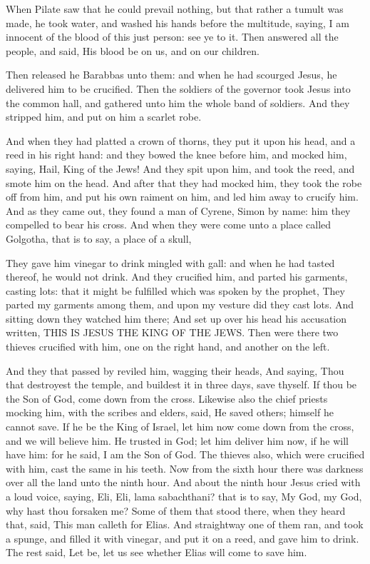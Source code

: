  When Pilate saw that he could prevail nothing, but that
rather a tumult was made, he took water, and washed his hands before the
multitude, saying, I am innocent of the blood of this just person: see
ye to it.  Then answered all the people, and said, His
blood be on us, and on our children.

 Then released he Barabbas unto them: and when he had
scourged Jesus, he delivered him to be crucified.  Then
the soldiers of the governor took Jesus into the common hall, and
gathered unto him the whole band of soldiers.  And they
stripped him, and put on him a scarlet robe.

 And when they had platted a crown of thorns, they put it
upon his head, and a reed in his right hand: and they bowed the knee
before him, and mocked him, saying, Hail, King of the Jews!
 And they spit upon him, and took the reed, and smote him
on the head.  And after that they had mocked him, they
took the robe off from him, and put his own raiment on him, and led him
away to crucify him.  And as they came out, they found a
man of Cyrene, Simon by name: him they compelled to bear his cross.
 And when they were come unto a place called Golgotha,
that is to say, a place of a skull,

 They gave him vinegar to drink mingled with gall: and
when he had tasted thereof, he would not drink.  And they
crucified him, and parted his garments, casting lots: that it might be
fulfilled which was spoken by the prophet, They parted my garments among
them, and upon my vesture did they cast lots.  And
sitting down they watched him there;  And set up over his
head his accusation written, THIS IS JESUS THE KING OF THE JEWS.
 Then were there two thieves crucified with him, one on
the right hand, and another on the left.

 And they that passed by reviled him, wagging their
heads,  And saying, Thou that destroyest the temple, and
buildest it in three days, save thyself. If thou be the Son of God, come
down from the cross.  Likewise also the chief priests
mocking him, with the scribes and elders, said,  He saved
others; himself he cannot save. If he be the King of Israel, let him now
come down from the cross, and we will believe him.  He
trusted in God; let him deliver him now, if he will have him: for he
said, I am the Son of God.  The thieves also, which were
crucified with him, cast the same in his teeth.  Now from
the sixth hour there was darkness over all the land unto the ninth hour.
 And about the ninth hour Jesus cried with a loud voice,
saying, Eli, Eli, lama sabachthani? that is to say, My God, my God, why
hast thou forsaken me?  Some of them that stood there,
when they heard that, said, This man calleth for Elias. 
And straightway one of them ran, and took a spunge, and filled it with
vinegar, and put it on a reed, and gave him to drink. 
The rest said, Let be, let us see whether Elias will come to save him.

